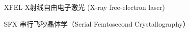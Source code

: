\begin{denotation}[3cm]
\item[XFEL] X射线自由电子激光 (X-ray free-electron laser)
\item[SFX] 串行飞秒晶体学（Serial Femtosecond Crystallography）
\end{denotation}
